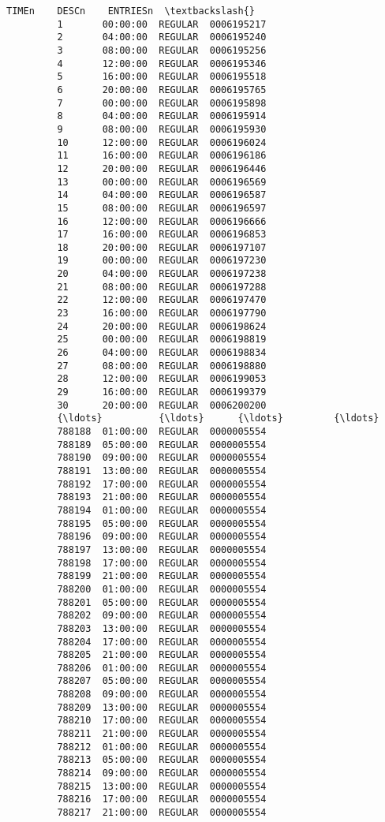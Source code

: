 \documentclass[11pt]{article}
\begin{document}
\begin{Verbatim}[commandchars=\\\{\}]
                    TIMEn    DESCn    ENTRIESn  \textbackslash{}
         1       00:00:00  REGULAR  0006195217   
         2       04:00:00  REGULAR  0006195240   
         3       08:00:00  REGULAR  0006195256   
         4       12:00:00  REGULAR  0006195346   
         5       16:00:00  REGULAR  0006195518   
         6       20:00:00  REGULAR  0006195765   
         7       00:00:00  REGULAR  0006195898   
         8       04:00:00  REGULAR  0006195914   
         9       08:00:00  REGULAR  0006195930   
         10      12:00:00  REGULAR  0006196024   
         11      16:00:00  REGULAR  0006196186   
         12      20:00:00  REGULAR  0006196446   
         13      00:00:00  REGULAR  0006196569   
         14      04:00:00  REGULAR  0006196587   
         15      08:00:00  REGULAR  0006196597   
         16      12:00:00  REGULAR  0006196666   
         17      16:00:00  REGULAR  0006196853   
         18      20:00:00  REGULAR  0006197107   
         19      00:00:00  REGULAR  0006197230   
         20      04:00:00  REGULAR  0006197238   
         21      08:00:00  REGULAR  0006197288   
         22      12:00:00  REGULAR  0006197470   
         23      16:00:00  REGULAR  0006197790   
         24      20:00:00  REGULAR  0006198624   
         25      00:00:00  REGULAR  0006198819   
         26      04:00:00  REGULAR  0006198834   
         27      08:00:00  REGULAR  0006198880   
         28      12:00:00  REGULAR  0006199053   
         29      16:00:00  REGULAR  0006199379   
         30      20:00:00  REGULAR  0006200200   
         {\ldots}          {\ldots}      {\ldots}         {\ldots}   
         788188  01:00:00  REGULAR  0000005554   
         788189  05:00:00  REGULAR  0000005554   
         788190  09:00:00  REGULAR  0000005554   
         788191  13:00:00  REGULAR  0000005554   
         788192  17:00:00  REGULAR  0000005554   
         788193  21:00:00  REGULAR  0000005554   
         788194  01:00:00  REGULAR  0000005554   
         788195  05:00:00  REGULAR  0000005554   
         788196  09:00:00  REGULAR  0000005554   
         788197  13:00:00  REGULAR  0000005554   
         788198  17:00:00  REGULAR  0000005554   
         788199  21:00:00  REGULAR  0000005554   
         788200  01:00:00  REGULAR  0000005554   
         788201  05:00:00  REGULAR  0000005554   
         788202  09:00:00  REGULAR  0000005554   
         788203  13:00:00  REGULAR  0000005554   
         788204  17:00:00  REGULAR  0000005554   
         788205  21:00:00  REGULAR  0000005554   
         788206  01:00:00  REGULAR  0000005554   
         788207  05:00:00  REGULAR  0000005554   
         788208  09:00:00  REGULAR  0000005554   
         788209  13:00:00  REGULAR  0000005554   
         788210  17:00:00  REGULAR  0000005554   
         788211  21:00:00  REGULAR  0000005554   
         788212  01:00:00  REGULAR  0000005554   
         788213  05:00:00  REGULAR  0000005554   
         788214  09:00:00  REGULAR  0000005554   
         788215  13:00:00  REGULAR  0000005554   
         788216  17:00:00  REGULAR  0000005554   
         788217  21:00:00  REGULAR  0000005554   
         

\end{Verbatim}
\end{document}

